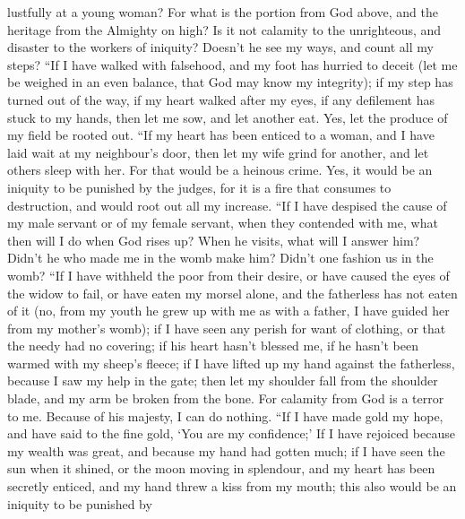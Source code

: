 lustfully at a young woman?  For what is the portion from
God above, and the heritage from the Almighty on high?  Is
it not calamity to the unrighteous, and disaster to the workers of
iniquity?  Doesn't he see my ways, and count all my steps?
 ``If I have walked with falsehood, and my foot has hurried
to deceit  (let me be weighed in an even balance, that God
may know my integrity);  if my step has turned out of the
way, if my heart walked after my eyes, if any defilement has stuck to my
hands,  then let me sow, and let another eat. Yes, let the
produce of my field be rooted out.  ``If my heart has been
enticed to a woman, and I have laid wait at my neighbour's door,
 then let my wife grind for another, and let others sleep
with her.  For that would be a heinous crime. Yes, it would
be an iniquity to be punished by the judges,  for it is a
fire that consumes to destruction, and would root out all my increase.
 ``If I have despised the cause of my male servant or of my
female servant, when they contended with me,  what then
will I do when God rises up? When he visits, what will I answer him?
 Didn't he who made me in the womb make him? Didn't one
fashion us in the womb?  ``If I have withheld the poor from
their desire, or have caused the eyes of the widow to fail,
 or have eaten my morsel alone, and the fatherless has not
eaten of it  (no, from my youth he grew up with me as with
a father, I have guided her from my mother's womb);  if I
have seen any perish for want of clothing, or that the needy had no
covering;  if his heart hasn't blessed me, if he hasn't
been warmed with my sheep's fleece;  if I have lifted up my
hand against the fatherless, because I saw my help in the gate;
 then let my shoulder fall from the shoulder blade, and my
arm be broken from the bone.  For calamity from God is a
terror to me. Because of his majesty, I can do nothing. 
``If I have made gold my hope, and have said to the fine gold, `You are
my confidence;'  If I have rejoiced because my wealth was
great, and because my hand had gotten much;  if I have seen
the sun when it shined, or the moon moving in splendour, 
and my heart has been secretly enticed, and my hand threw a kiss from my
mouth;  this also would be an iniquity to be punished by
